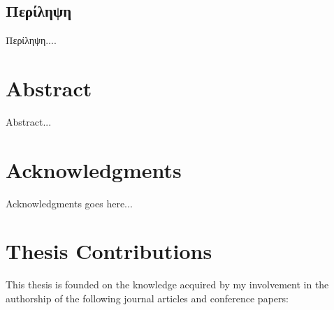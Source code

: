 \documentclass[a4paper,12pt,openright,oneside]{book}
\begin{document}
\onehalfspace



\coverpage
\copyrightpage
\clearpage
\approvalpage
\declarationpage
\setcounter{page}{1}



\begin{otherlanguage}{greek}	
\chapter*{Περίληψη}
Περίληψη....




\end{otherlanguage}
\newpage




\chapter*{Abstract}

Abstract...




\newpage




\chapter*{Acknowledgments}

Acknowledgments goes here...

\newpage


\chapter*{Thesis Contributions}
This thesis is founded on the knowledge acquired by my involvement in the authorship of the following journal articles and conference papers:
\end{document}
